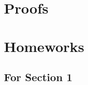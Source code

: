 \newpage
\begin{appendices}


\section{Proofs}

\subsection{} \label{}



\newpage
\section{Homeworks}
\subsection{For Section 1}
\begin{question}

\end{question}


\end{appendices}
